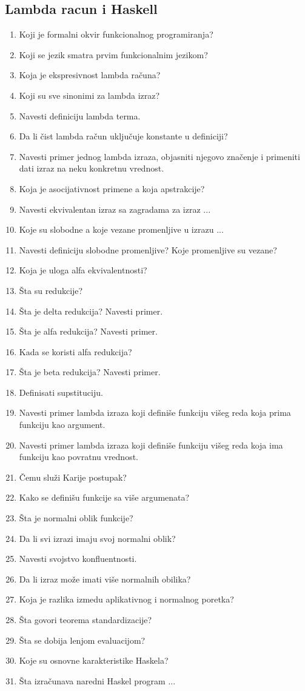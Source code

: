 \documentclass[main.tex]{subfiles}
\begin{document}
\begin{multicols}{2}
\subsection{Lambda racun i Haskell}
\begin{enumerate}
\item Koji je formalni okvir funkcionalnog programiranja?
\item Koji se jezik smatra prvim funkcionalnim jezikom?
\item Koja je ekspresivnost lambda računa?
\item Koji su sve sinonimi za lambda izraz?
\item Navesti definiciju lambda terma.
\item Da li čist lambda račun uključuje konstante u definiciji?
\item Navesti primer jednog lambda izraza, objasniti njegovo značenje i primeniti dati izraz na neku konkretnu vrednost.
\item Koja je asocijativnost primene a koja apstrakcije?
\item Navesti ekvivalentan izraz sa zagradama za izraz ...
\item Koje su slobodne a koje vezane promenljive u izrazu ...
\item Navesti definiciju slobodne promenljive? Koje promenljive su vezane?
\item Koja je uloga alfa ekvivalentnosti?
\item Šta su redukcije?
\item Šta je delta redukcija? Navesti primer.
\item Šta je alfa redukcija? Navesti primer.
\item Kada se koristi alfa redukcija?
\item Šta je beta redukcija? Navesti primer.
\item Definisati supstituciju.
\item Navesti primer lambda izraza koji definiše funkciju višeg reda koja prima funkciju kao argument.
\item Navesti primer lambda izraza koji definiše funkciju višeg reda koja ima funkciju kao povratnu vrednost.
\item Čemu služi Karije postupak?
\item Kako se definišu funkcije sa više argumenata?
\item Šta je normalni oblik funkcije?
\item Da li svi izrazi imaju svoj normalni oblik?
\item Navesti svojstvo konfluentnosti.
\item Da li izraz može imati više normalnih obilika?
\item Koja je razlika izmedu aplikativnog i normalnog poretka?
\item Šta govori teorema standardizacije?
\item Šta se dobija lenjom evaluacijom?
\item Koje su osnovne karakteristike Haskela?
\item Šta izračunava naredni Haskel program ...


\end{enumerate}
\end{multicols}
\end{document}
